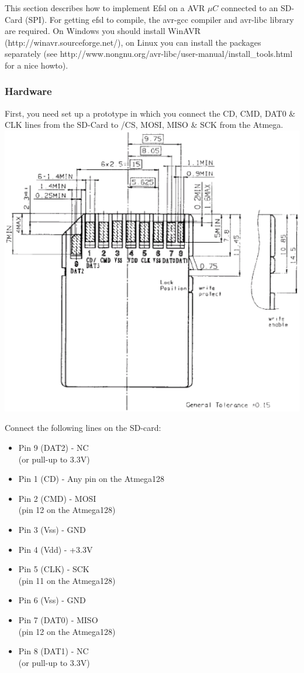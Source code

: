 This section describes how to implement Efsl on a AVR $\mu C$ connected to
an SD-Card (SPI). For getting efsl to compile, the avr-gcc compiler and 
avr-libc library are required. On Windows you should install WinAVR 
(http://winavr.sourceforge.net/), on Linux you can install the packages 
separately (see http://www.nongnu.org/avr-libc/user-manual/install\_tools.html
for a nice howto).
\subsubsection{Hardware}
First, you need set up a prototype in which you connect the CD, CMD, DAT0
\& CLK lines from the SD-Card to /CS, MOSI, MISO \& SCK from the Atmega.
\newline
\includegraphics[scale=0.65]{pics/sdcard.eps}
\newline
\parbox[c]{.5\textwidth}{
Connect the following lines on the SD-card:
\begin{itemize}
	\item{Pin 9 (DAT2) - NC\\(or pull-up to 3.3V)}
	\item{Pin 1 (CD) - Any pin on the Atmega128}
	\item{Pin 2 (CMD) - MOSI\\(pin 12 on the Atmega128)}
	\item{Pin 3 (Vss) - GND}
	\item{Pin 4 (Vdd) - +3.3V}
	\item{Pin 5 (CLK) - SCK\\(pin 11 on the Atmega128)}
	\item{Pin 6 (Vss) - GND}
	\item{Pin 7 (DAT0) - MISO\\(pin 12 on the Atmega128)}
	\item{Pin 8 (DAT1) - NC\\(or pull-up to 3.3V)}
\end{itemize}
}
